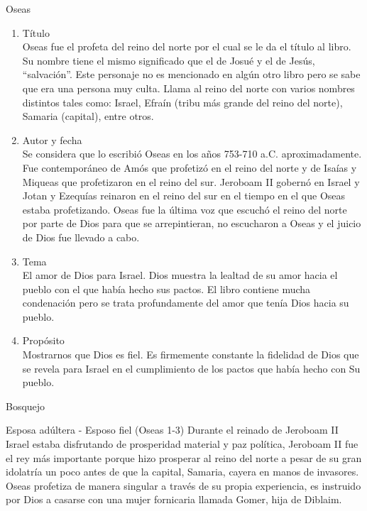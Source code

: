 %
%
\begin{section}{Oseas}
	\begin{enumerate}
		\item Título\\
			Oseas fue el profeta del reino del norte por el cual se le da el título al libro. Su nombre tiene el mismo significado que el de Josué y el de Jesús, ``salvación''. Este personaje no es mencionado en algún otro libro pero se sabe que era una persona muy culta. Llama al reino del norte con varios nombres distintos tales como: Israel, Efraín (tribu más grande del reino del norte), Samaria (capital), entre otros. 
		\item Autor y fecha\\
			Se considera que lo escribió Oseas en los años 753-710 a.C. aproximadamente. Fue contemporáneo de Amós que profetizó en el reino del norte y de Isaías y Miqueas que profetizaron en el reino del sur. Jeroboam II gobernó en Israel y Jotan y Ezequías reinaron en el reino del sur en el tiempo en el que Oseas estaba profetizando. Oseas fue la última voz que escuchó el reino del norte por parte de Dios para que se arrepintieran, no escucharon a Oseas y el juicio de Dios fue llevado a cabo.
		\item Tema\\
			El amor de Dios para Israel. Dios muestra la lealtad de su amor hacia el pueblo con el que había hecho sus pactos. El libro contiene mucha condenación pero se trata profundamente del amor que tenía Dios hacia su pueblo.
		\item Propósito\\
			Mostrarnos que Dios es fiel. Es firmemente constante la fidelidad de Dios que se revela para Israel en el cumplimiento de los pactos que había hecho con Su pueblo. 
	\end{enumerate}
	\begin{subsection}{Bosquejo}
		\begin{subsubsection}{Esposa adúltera - Esposo fiel (Oseas 1-3)}
			Durante el reinado de Jeroboam II Israel estaba disfrutando de prosperidad material y paz política, Jeroboam II fue el rey más importante porque hizo prosperar al reino del norte a pesar de su gran idolatría un poco antes de que la capital, Samaria, cayera en manos de invasores. Oseas profetiza de manera singular a través de su propia experiencia, es instruido por Dios a casarse con una mujer fornicaria llamada Gomer, hija de Diblaim.\\

\end{subsubsection}
\end{subsection}
\end{section}

